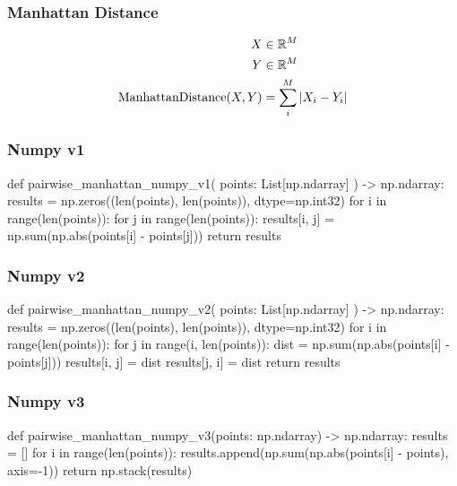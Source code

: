 \documentclass{beamer}
\DeclareMathOperator{\md}{Manhattan Distance}
\begin{document}
\begin{frame}
    \frametitle{Manhattan Distance}
    \begin{align*}
        X &\in \R^{M} \\
        Y &\in \R^{M} \\
        \md(X, Y) &= \sum_i^M | X_i - Y_i |
    \end{align*}
\end{frame}

\begin{frame}[fragile]
\frametitle{Numpy v1}

    \begin{pythoncode}
def pairwise_manhattan_numpy_v1(
    points: List[np.ndarray]
) -> np.ndarray:
    results = np.zeros((len(points), len(points)), dtype=np.int32)
    for i in range(len(points)):
        for j in range(len(points)):
            results[i, j] = np.sum(np.abs(points[i] - points[j]))
    return results
    \end{pythoncode}
\end{frame}


\begin{frame}[fragile]
\frametitle{Numpy v2}

    \begin{pythoncode}
def pairwise_manhattan_numpy_v2(
    points: List[np.ndarray]
) -> np.ndarray:
    results = np.zeros((len(points), len(points)), dtype=np.int32)
    for i in range(len(points)):
        for j in range(i, len(points)):
            dist = np.sum(np.abs(points[i] - points[j]))
            results[i, j] = dist
            results[j, i] = dist
    return results
    \end{pythoncode}
\end{frame}

\begin{frame}[fragile]
\frametitle{Numpy v3}

    \begin{pythoncode}
def pairwise_manhattan_numpy_v3(points: np.ndarray) -> np.ndarray:
    results = []
    for i in range(len(points)):
        results.append(np.sum(np.abs(points[i] - points), axis=-1))
    return np.stack(results)

    \end{pythoncode}
\end{frame}
\end{document}
